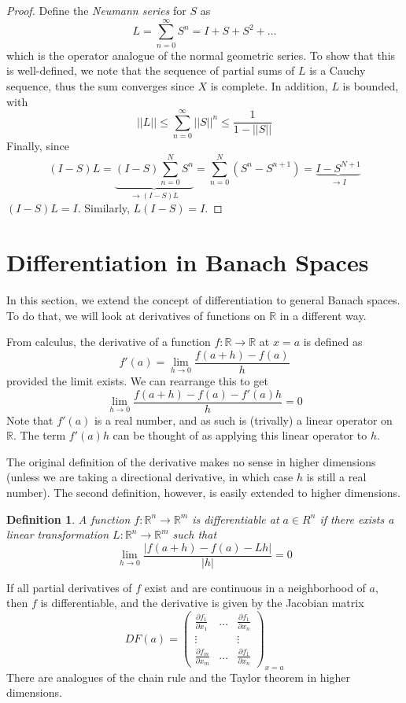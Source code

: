 \documentclass[10pt]{article}         %
\newtheorem{definition}{Definition}[section]
\theoremstyle{remark}
\newcommand{\R}{\mathbb{R}}
\begin{document}
\begin{proof}
Define the \emph{Neumann series} for $S$ as 
\[
L = \sum_{n=0}^{\infty} S^n = I + S + S^2 + ... 
\]
which is the operator analogue of the normal geometric series. To show that this is well-defined, we note that the sequence of partial sums of $L$ is a Cauchy sequence, thus the sum converges since $X$ is complete. In addition, $L$ is bounded,
with
\[
||L|| \leq \sum_{n=0}^\infty ||S||^n \leq \frac{1}{1 - ||S||}
\]
Finally, since
\[(I - S)L = \underbrace{(I - S) \sum_{n=0}^{N} S^n}_{\rightarrow (I-S)L} = \sum_{n=0}^N (S^n - S^{n+1}) = 
\underbrace{I - S^{N+1}}_{\rightarrow I}
\]
$(I-S)L = I$. Similarly, $L(I - S) = I$.
\end{proof}

\section{Differentiation in Banach Spaces}

In this section, we extend the concept of differentiation to general Banach spaces. To do that, we will look at derivatives of functions on $\R$ in a different way.

From calculus, the derivative of a function $f: \R \rightarrow \R$ at $x = a$ is defined as 
\[
f'(a) = \lim_{h \rightarrow 0}\frac{f(a + h) - f(a)}{h}
\]
provided the limit exists. We can rearrange this to get
\[
\lim_{h \rightarrow 0}\frac{f(a + h) - f(a) - f'(a) h }{h} = 0
\]
Note that $f'(a)$ is a real number, and as such is (trivally) a linear operator on $\R$. The term $f'(a) h$ can be thought of as applying this linear operator to $h$.

The original definition of the derivative makes no sense in higher dimensions (unless we are taking a directional derivative, in which case $h$ is still a real number). The second definition, however, is easily extended to higher dimensions.

\begin{definition}
A function $f:\R^n \rightarrow \R^m$ is \emph{differentiable} at $a \in R^n$ if there exists a linear transformation $L: \R^n \rightarrow \R^m$ such that
\[
\lim_{h \rightarrow 0}\frac{|f(a + h) - f(a) - L h |}{|h|} = 0
\]
\end{definition}

If all partial derivatives of $f$ exist and are continuous in a neighborhood of $a$, then $f$ is differentiable, and the derivative is given by the Jacobian matrix
\[
DF(a) = \begin{pmatrix}
\frac{\partial f_1}{\partial x_1} & \dots & \frac{\partial f_1}{\partial x_n} \\
\vdots && \vdots \\
\frac{\partial f_m}{\partial x_m} & \dots & \frac{\partial f_1}{\partial x_n} 
\end{pmatrix}_{x = a}
\]
There are analogues of the chain rule and the Taylor theorem in higher dimensions. 
\end{document}
